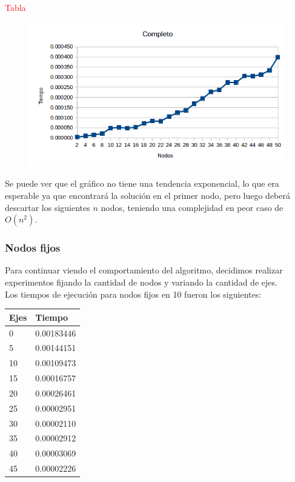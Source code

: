 \textcolor{red}{Tabla}


  \begin{figure}[h!]
   \begin{center}
 	\includegraphics[scale=0.7]{imagenes/exacto/Completos.png}
   \end{center}
 \end{figure}

Se puede ver que el gr\'afico no tiene una tendencia exponencial, lo que era esperable ya que encontrar\'a la soluci\'on en el primer nodo, pero luego deber\'a descartar los siguientes $n$ nodos,
teniendo una complejidad en peor caso de $O(n^2)$.\\

\newpage

\subsubsection{Nodos fijos}
Para continuar viendo el comportamiento del algoritmo, decidimos realizar experimentos fijando la cantidad de nodos y variando la cantidad de ejes.\\

Los tiempos de ejecuci\'on para nodos fijos en 10 fueron los siguientes:\\

\begin{tabular}{| l | l |}
  \hline
  Ejes & Tiempo \\ \hline
  0 & 0.00183446 \\ \hline
  5 & 0.00144151 \\ \hline
  10 & 0.00109473 \\ \hline
  15 & 0.00016757 \\ \hline
  20 & 0.00026461 \\ \hline
  25 & 0.00002951 \\ \hline
  30 & 0.00002110 \\ \hline
  35 & 0.00002912 \\ \hline
  40 & 0.00003069 \\ \hline
  45 & 0.00002226 \\ \hline
\end{tabular}

